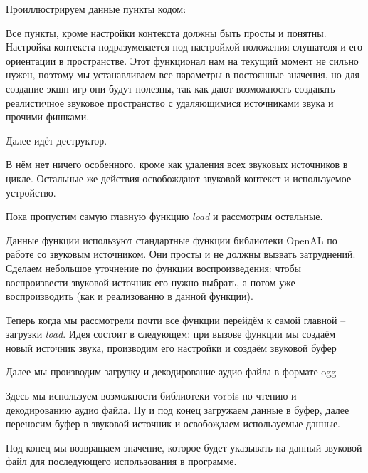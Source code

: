Проиллюстрируем данные пункты кодом:


Все пункты, кроме настройки контекста должны быть просты и понятны. Настройка контекста 
подразумевается под настройкой положения слушателя и его ориентации в пространстве. 
Этот функционал нам на текущий момент не сильно нужен, поэтому мы устанавливаем все 
параметры в постоянные значения, но для создание экшн игр они будут полезны, так как 
дают возможность создавать реалистичное звуковое пространство с удаляющимися источниками 
звука и прочими фишками. 


Далее идёт деструктор. 


В нём нет ничего особенного, кроме как удаления всех звуковых источников в цикле. 
Остальные же действия освобождают  звуковой контекст и используемое устройство.

\pagebreak

Пока пропустим самую главную функцию \emph{load} и рассмотрим остальные.


Данные функции используют стандартные функции библиотеки OpenAL по работе со звуковым 
источником. Они просты и не должны вызвать затруднений. Сделаем небольшое уточнение по 
функции воспроизведения: чтобы воспроизвести звуковой источник его нужно выбрать, а 
потом уже воспроизводить (как и реализованно в данной функции).

Теперь когда мы рассмотрели почти все функции перейдём к самой главной -- загрузки 
\emph{load}. Идея состоит в следующем: при вызове функции мы создаём новый источник 
звука, производим его настройки и создаём звуковой буфер


Далее мы производим загрузку и декодирование аудио файла в формате ogg


Здесь мы используем возможности библиотеки vorbis по чтению и декодированию аудио файла. 
Ну и под конец загружаем данные в буфер, далее переносим буфер в звуковой источник и 
освобождаем используемые данные.


Под конец мы возвращаем значение, которое будет указывать на данный звуковой файл для 
последующего использования в программе.

